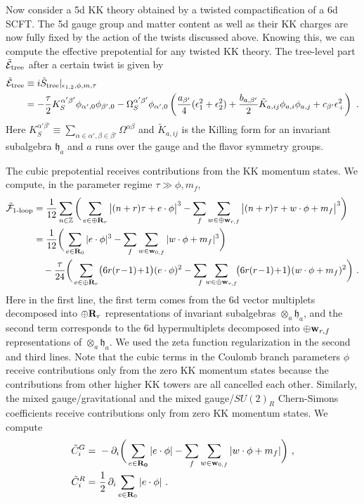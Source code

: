 Now consider a 5d KK theory obtained by a twisted compactification of a 6d SCFT. The 5d gauge group and matter content as well as their KK charges are now fully fixed by the action of the twists discussed above. Knowing this, we can compute the effective prepotential for any twisted KK theory. The tree-level part $\tilde{\mathcal{E}}_{\rm tree}$ after a certain twist is given by
\begin{align}
	\tilde{\mathcal{E}}_{\rm tree} &\equiv i\tilde{S}_{\rm tree}|_{\epsilon_{1,2},\phi,m,\tau} \nonumber \\
	&= -\frac{\tau}{2}K^{\alpha'\beta'}_S\phi_{\alpha',0}\phi_{\beta',0} - \Omega^{\alpha'\beta'}_S\phi_{\alpha',0}\left(\frac{a_{\beta'}}{4}(\epsilon_1^2+\epsilon_2^2)+\frac{b_{a,\beta'}}{2}\tilde{K}_{a,ij}\phi_{a,i}\phi_{a,j}+c_{\beta'} \epsilon_+^2\right) \nonumber \ .
\end{align}
Here $K_S^{\alpha'\beta'}\equiv\sum_{\alpha\in\alpha',\beta\in\beta'}\Omega^{\alpha\beta}$ and $\tilde{K}_{a,ij}$ is the Killing form for an invariant subalgebra $\mathfrak{h}_a$ and $a$ runs over the gauge and the flavor symmetry groups.

The cubic prepotential receives contributions from the KK momentum states. We compute, in the parameter regime $\tau\gg \phi,m_f$,
\begin{align}
\tilde{\mathcal{F}}_{\text{1-loop}} 
&= \frac{1}{12}\sum_{n\in \mathbb{Z}} \bigg(\sum_{e\in \oplus{\bf R}_r} \big|(n+r)\tau + e\cdot \phi\big|^3 - \sum_f \sum_{w\in \oplus{\bf w}_{r,f}} \big|(n+r)\tau +w\cdot \phi+m_f\big|^3\bigg) \nonumber \\
&= \frac{1}{12}\bigg(\sum_{e\in {\bf R}_0} | e\cdot \phi|^3 - \sum_f \sum_{w\in {\bf w}_{0,f} } |w\cdot \phi+m_f|^3\bigg) \\
&\quad -\frac{\tau}{24}\bigg(\sum_{e \in \oplus{\bf R}_r} \!\big(6r(r\!-\!1)\!+\!1\big)(e\cdot \phi)^2 - \sum_f\!\!\sum_{w \in \oplus {\bf w}_{r,f}}\!\!\big(6r(r\!-\!1)\!+\!1\big)(w\cdot \phi+m_f)^2\bigg) \ .\nonumber
\end{align}
Here in the first line, the first term comes from the 6d vector multiplets decomposed into $\oplus {\bf R}_r$ representations of invariant subalgebras $\otimes_a \mathfrak{h}_a$, and the second term corresponds to the 6d hypermultiplets decomposed into $\oplus {\bf w}_{r,f}$ representations of $\otimes_a \mathfrak{h}_a$. We used the zeta function regularization in the second and third lines. Note that the cubic terms in the Coulomb branch parameters $\phi$ receive contributions only from the zero KK momentum states because the contributions from other higher KK towers are all cancelled each other. Similarly, the mixed gauge/gravitational and the mixed gauge/$SU(2)_R$ Chern-Simons coefficients receive contributions only from zero KK momentum states. We compute
\begin{align}
	\tilde{C}^G_i = ~&-\partial_i\bigg(\sum_{e\in {\bf R_0}}|e\cdot \phi| - \sum_f\sum_{w\in{\bf w}_{0,f}}|w\cdot\phi+m_f|\bigg) \ , \nonumber \\
	\tilde{C}^R_i =~& \frac{1}{2}\, \partial_i \sum_{e\in {\bf R}_0}|e\cdot \phi| \ .
\end{align}

